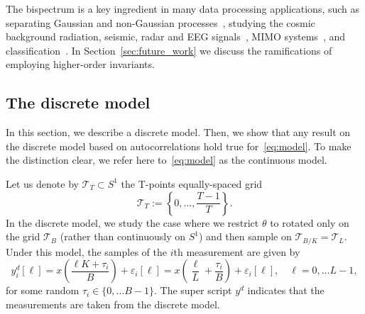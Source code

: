 \documentclass[english,12pt]{article}
\newcommand{\T}{\mathcal{T}}
\numberwithin{equation}{section}
\numberwithin{thm}{section} %
\begin{document}
The bispectrum is a key ingredient in many data processing applications, such as separating Gaussian and non-Gaussian processes~\cite{brockett1988bispectral}, studying the cosmic background
radiation, seismic, radar and EEG signals~\cite{wang2000cosmic,chen2008feature,ning1989bispectral}, MIMO systems~\cite{chen2001frequency}, and classification~\cite{zhao2014rotationally}.  
In Section~\ref{sec:future_work} we discuss the ramifications of employing higher-order invariants.  

\subsection{The discrete model} \label{sec:discrete_analysis}

In this section, we describe a discrete model. Then, we show that
any result on the discrete model based on autocorrelations hold true for~\eqref{eq:model}. To make the distinction clear, we refer here to~\eqref{eq:model} as the continuous model.

Let us denote by $\T_T\subset S^1$ the T-points equally-spaced grid 
 \begin{equation} \label{eq:grid}
 \mathcal{T}_T:=\left\{0,\ldots,\frac{T-1}{T}\right\}.
 \end{equation}
 In the discrete model, we study the case where we restrict $\theta$ to rotated only on the grid $\T_B$ (rather than continuously on $S^1$) and then sample on $\T_{B/K}=\T_{L}$.
 Under this model, the samples of the $i$th measurement are given by
 \begin{equation} \label{eq:discrete_model}
 y_i^d[\ell] = x\left(\frac{\ell K+\tau_i}{B}\right) + \varepsilon_i[\ell]=x\left(\frac{\ell}{L} + \frac{\tau_i}{B}\right)+\varepsilon_i[\ell], \quad \ell=0,\ldots L-1,
 \end{equation}
 for some random $\tau_i\in\{0,\ldots B-1\}$. The super script $y^d$ indicates that the measurements are taken from the discrete model. 
\end{document}

